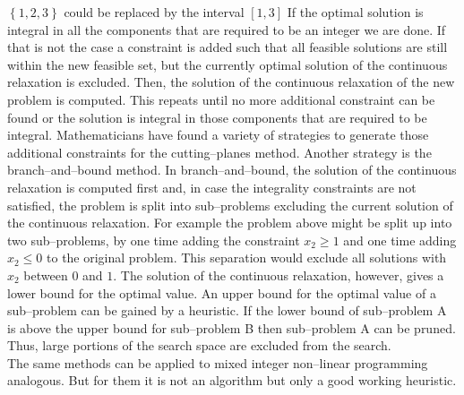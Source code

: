  $\left\lbrace 1,2,3 \right\rbrace $
  could be replaced by the interval 
  $\left[ 1,3 \right] $
If the optimal solution is integral in all the components that are required to be an integer we are done. If that is not the case a constraint is added such that all feasible solutions are still within the new feasible set, but the currently optimal solution of the continuous relaxation is excluded. Then, the solution of the continuous relaxation of the new problem is computed. This repeats until no more additional constraint can be found or the solution is integral in those components that are required to be integral. Mathematicians have found a variety of strategies to generate those additional constraints for the cutting--planes method. Another strategy is the branch--and--bound method. In branch--and--bound, the solution of the continuous relaxation is computed first and, in case the integrality constraints are not satisfied, the problem is split into sub--problems excluding the current solution of the continuous relaxation. For example the problem above might be split up into two sub--problems, by one time adding the constraint $x_2\geq 1$ and one time adding $x_2\leq 0$ to the original problem. This separation would exclude all solutions with $x_2$ between $0$ and $1$. The solution of the continuous relaxation, however, gives a lower bound for the optimal value. An upper bound for the optimal value of a sub--problem can be gained by a heuristic. If the lower bound of sub--problem \textsf{A} is above the upper bound for sub--problem \textsf{B} then sub--problem \textsf{A} can be pruned. Thus, large portions of the search space are excluded from the search.\\
The same methods can be applied to mixed integer non--linear programming analogous. But for them it is not an algorithm but only a good working heuristic.
